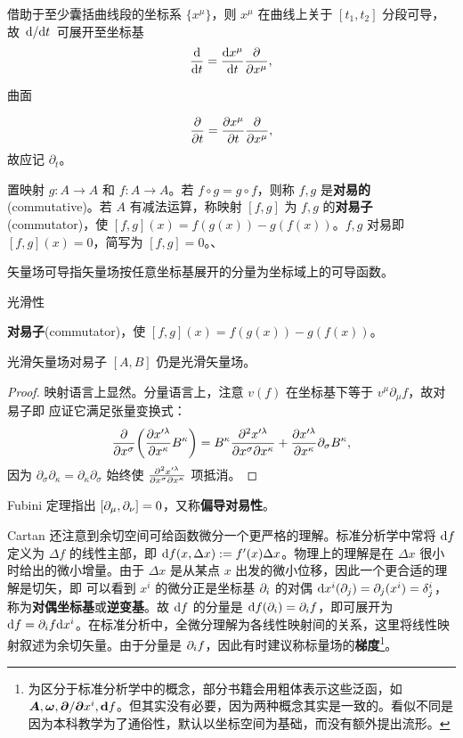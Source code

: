 \begin{theorem}
\end{theorem}

借助于至少囊括曲线段的坐标系 $\{x^\mu\}$，则 $x^\mu$ 在曲线上关于 $[t_1,t_2]$ 分段可导，故 $\dv*{t}$ 可展开至坐标基
    \[\dv{t}=\dv{x^\mu}{t}\pdv{x^\mu},\]

曲面

\[
        \pdv{t}=\pdv{x^\mu}{t}\pdv{x^\mu},
    \]
    故应记 $\partial_t$。

置映射 $g:A\to A$ 和 $f:A\to A$。若 $f\circ g=g\circ f$，则称 $f,g$ 是\textbf{对易的}(commutative)。若 $A$ 有减法运算，称映射 $[f,g]$ 为 $f,g$ 的\textbf{对易子}(commutator)，使 $[f,g](x)=f(g(x))-g(f(x))$。$f,g$ 对易即 $[f,g](x)=0$，简写为 $[f,g]=0$。、

矢量场可导指矢量场按任意坐标基展开的分量为坐标域上的可导函数。

光滑性

\begin{definition}
    \textbf{对易子}(commutator)，使 $[f,g](x)=f(g(x))-g(f(x))$。
\end{definition}


\begin{theorem}
    光滑矢量场对易子 $[A,B]$ 仍是光滑矢量场。
\end{theorem}
\begin{proof}
    映射语言上显然。分量语言上，注意 $v(f)$ 在坐标基下等于 $v^\mu\partial_\mu f$，故对易子即
    应证它满足张量变换式：
    \[
        \pdv{x^\sigma}(\pdv{x'^\lambda}{x^\kappa}B^\kappa)=  B^\kappa\pdv{x'^\lambda}{x^\sigma}{x^\kappa}+\pdv{x'^\lambda}{x^\kappa}\partial_\sigma B^\kappa,
    \]
    因为 $\partial_\sigma\partial_\kappa=\partial_\kappa\partial_\sigma$ 始终使 $\pdv{x'^\lambda}{x^\sigma}{x^\kappa}$ 项抵消。
\end{proof}

\begin{eg}
    Fubini 定理指出 $\left[\partial_\mu,\partial_\nu\right]=0$，又称\textbf{偏导对易性}。
\end{eg}


Cartan 还注意到余切空间可给函数微分一个更严格的理解。标准分析学中常将 $\dd f$ 定义为 $\Delta f$ 的线性主部，即 $\dd f(x,\Delta x):=f'(x)\Delta x$。物理上的理解是在 $\Delta x$ 很小时给出的微小增量。由于 $\Delta x$ 是从某点 $x$ 出发的微小位移，因此一个更合适的理解是切矢，即
可以看到 $x^i$ 的微分正是坐标基 $\partial_i$ 的对偶 $\dd x^i(\partial_j)=\partial_j(x^i)=\delta^i_j$，称为\textbf{对偶坐标基}或\textbf{逆变基}。故 $\dd f$ 的分量是 $\dd f(\partial_i)=\partial_i f$，即可展开为 $\dd f=\partial_i f \dd x^i$。在标准分析中，全微分理解为各线性映射间的关系，这里将线性映射叙述为余切矢量。由于分量是 $\partial_i f$，因此有时建议称标量场的\textbf{梯度}\footnote{为区分于标准分析学中的概念，部分书籍会用粗体表示这些泛函，如 $\vb* A,\vb*\omega,\vb*{\partial}/{\vb*{\partial}x^i},\vb*{\dd}f$。但其实没有必要，因为两种概念其实是一致的。看似不同是因为本科教学为了通俗性，默认以坐标空间为基础，而没有额外提出流形。}。

